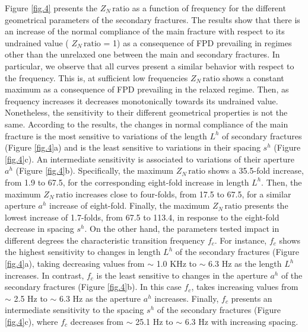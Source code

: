 \documentclass[draft]{agujournal2019}
\begin{document}
Figure \ref{fig.4} presents the $Z_N\, \text{ratio}$ as a function of frequency for the different geometrical parameters of the secondary fractures. The results show that there is an increase of the normal compliance of the main fracture with respect to its undrained value ( $Z_N\, \text{ratio}$ =  1) as a consequence of FPD prevailing in regimes other than the unrelaxed one between the main and secondary fractures. In particular, we observe that all curves present a similar behavior with respect to the frequency. This is, at sufficient low frequencies 
$Z_N\, \text{ratio}$ shows a constant maximum as a consequence of FPD prevailing in the relaxed regime. Then, as frequency increases it decreases monotonically towards its undrained value.
Nonetheless, the sensitivity to their different geometrical properties is not the same.
According to the results, the changes in normal compliance of the main fracture is the most sensitive to variations of the length $L^h$ of secondary fractures (Figure \ref{fig.4}a) and is the least sensitive to variations in their spacing $s^h$ (Figure \ref{fig.4}c). An intermediate sensitivity is associated to variations of their aperture $a^h$ (Figure \ref{fig.4}b). Specifically, the maximum $Z_N\, \text{ratio}$ shows a 35.5-fold increase, from 1.9 to 67.5, for the corresponding eight-fold increase in length $L^h$. Then, the maximum  $Z_N\, \text{ratio}$ increases close to four-folds, from 17.5 to 67.5, for a similar aperture $a^h$ increase of eight-fold. Finally, the maximum $Z_N\, \text{ratio}$  presents the lowest increase of 1.7-folds, from 67.5 to 113.4, in response to the eight-fold decrease in spacing $s^h$. On the other hand, the parameters tested impact in different degrees the characteristic transition frequency $f_c$. For instance, $f_c$ shows the highest sensitivity to changes in length $L^h$ of the secondary fractures (Figure \ref{fig.4}a), taking decreasing values from $\sim$ 1.0 KHz to $\sim$ 6.3 Hz as the length $L^h$ increases. In contrast, $f_c$ is the least sensitive to changes in the aperture $a^h$ of the secondary fractures (Figure \ref{fig.4}b). In this case $f_c$, takes increasing values from  $\sim$ 2.5 Hz to  $\sim$ 6.3 Hz as the aperture $a^h$ increases. Finally, $f_c$ presents an intermediate sensitivity to the spacing $s^h$ of the secondary fractures (Figure \ref{fig.4}c), where $f_c$ decreases from  $\sim$ 25.1 Hz to  $\sim$ 6.3 Hz with increasing spacing.
\end{document}
